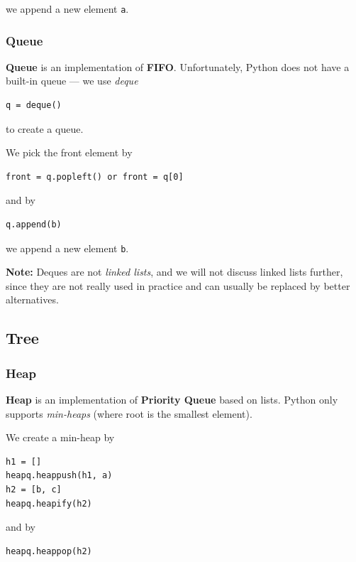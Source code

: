 \documentclass{article}
\begin{document}
we append a new element \texttt{a}.

\subsubsection{Queue}

\textbf{Queue} is an implementation of \textbf{FIFO}. Unfortunately, Python does not have a built-in queue --- we use \emph{deque}

\begin{lstlisting}[style=python]
q = deque()
\end{lstlisting}

to create a queue.

We pick the front element by

\begin{lstlisting}[style=python]
front = q.popleft() or front = q[0]
\end{lstlisting}

and by

\begin{lstlisting}[style=python]
q.append(b)
\end{lstlisting}

we append a new element \texttt{b}.

\textbf{Note:} Deques are not \emph{linked lists}, and we will not discuss linked lists further, since they are not really used in practice and can usually be replaced by better alternatives.

\newpage

\subsection{Tree}

\subsubsection{Heap}

\textbf{Heap} is an implementation of \textbf{Priority Queue} based on lists. Python only supports \emph{min-heaps} (where root is the smallest element).

We create a min-heap by

\begin{lstlisting}[style=python]
h1 = []
heapq.heappush(h1, a)
h2 = [b, c]
heapq.heapify(h2)
\end{lstlisting}

and by

\begin{lstlisting}[style=python]
heapq.heappop(h2)
\end{lstlisting}
\end{document}
